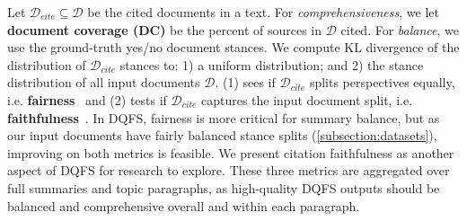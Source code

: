 Let $\mathcal{D}_{cite} \subseteq \mathcal{D}$ be the cited documents in a text.
For \textit{comprehensiveness}, we let \textbf{document coverage (DC)} be the percent of sources in $\mathcal{D}$ cited.
For \textit{balance}, we use the ground-truth yes/no document stances.
We compute KL divergence of the distribution of $\mathcal{D}_{cite}$ stances to: 1) a uniform distribution; and 2) the stance distribution of all input documents $\mathcal{D}$.
(1) sees if $\mathcal{D}_{cite}$ splits perspectives equally, i.e. \textbf{fairness}~\cite{zhang-etal-2024-fair} and (2) tests if $\mathcal{D}_{cite}$ captures the input document split, i.e. \textbf{faithfulness}~\cite{fischer2022measuring}.
In DQFS, fairness is more critical for summary balance, but as our input documents have fairly balanced stance splits (\cref{subsection:datasets}), improving on both metrics is feasible.
We present citation faithfulness as another aspect of DQFS for research to explore.
These three metrics are aggregated over full summaries and topic paragraphs, as high-quality DQFS outputs should be balanced and comprehensive overall and within each paragraph.